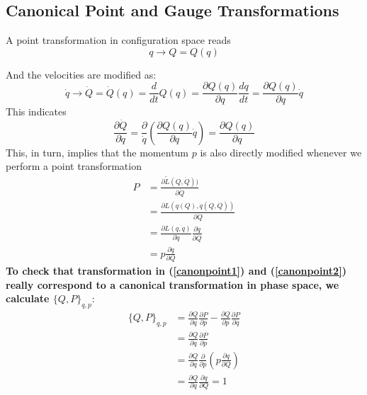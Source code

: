 \subsection{Canonical Point and Gauge Transformations}
A point transformation in configuration space reads
\begin{equation}
    q \rightarrow Q=Q(q)
    \label{canonpoint1}
\end{equation}

And the velocities are modified as:
$$
\dot{q} \rightarrow \dot{Q}=\dot{Q}(q)=\frac{d}{d t} Q(q)=\frac{\partial Q(q)}{\partial q} \frac{d q}{d t}=\frac{\partial Q(q)}{\partial q} \dot{q}
$$
This indicates
$$
\frac{\partial \dot{Q}}{\partial \dot{q}} = \frac{\partial}{\dot{q}}\left(\frac{\partial Q(q)}{\partial q} \dot{q}\right)=\frac{\partial Q(q)}{\partial q}
$$
This, in turn, implies that the momentum $p$ is also directly modified whenever we perform a point transformation
\begin{equation}
    \begin{aligned}
P &=\frac{\partial \tilde{L}(Q, \dot{Q}))}{\partial \dot{Q}} \\
&=\frac{\partial L(q(Q), \dot{q}(Q, \dot{Q}))}{\partial \dot{Q}} \\
&=\frac{\partial L(q, \dot{q})}{\partial \dot{q}} \frac{\partial \dot{q}}{\partial \dot{Q}} \\
&=p \frac{\partial q}{\partial Q}
\end{aligned}
\label{canonpoint2}
\end{equation}
\textbf{To check that transformation in (\ref{canonpoint1}) and (\ref{canonpoint2}) really correspond to a canonical transformation in phase space, we calculate $\{Q, P\}_{q, p}$}:
$$
\begin{aligned}
\{Q, P\}_{q, p} &=\frac{\partial Q}{\partial q} \frac{\partial P}{\partial p}-\frac{\partial Q}{\partial p} \frac{\partial P}{\partial q} \\
&=\frac{\partial Q}{\partial q} \frac{\partial P}{\partial p} \\
&=\frac{\partial Q}{\partial q} \frac{\partial}{\partial p}\left(p \frac{\partial q}{\partial Q}\right) \\
&=\frac{\partial Q}{\partial q} \frac{\partial q}{\partial Q}=1
\end{aligned}
$$

